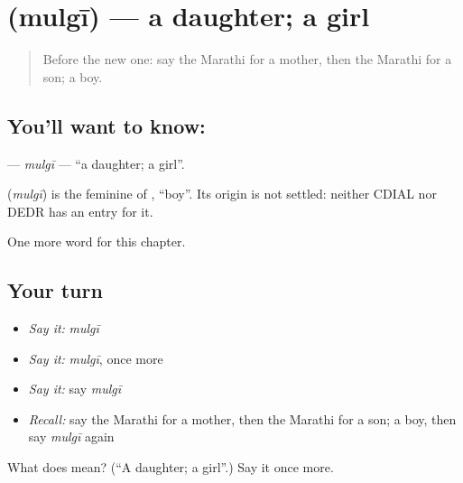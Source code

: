 \section[\texorpdfstring{\mr{मुलगी} (mulgī)}{मुलगी (mulgī)}]{ (mulgī) — a daughter; a girl}

\label{lesson:MR-C74-mulgi}



\begin{quote}
Before the new one: say the Marathi for a mother, then the Marathi for a son; a boy.
\end{quote}

\subsection*{You'll want to know: }
\textbf{} — \emph{mulgī} — \textquotedblleft{}a daughter; a girl\textquotedblright{}.

\begin{cousinweb}
\textbf{} (\emph{mulgī}) is the feminine of \textbf{}, \textquotedblleft{}boy\textquotedblright{}. Its origin is not settled: neither CDIAL nor DEDR has an entry for it.
\end{cousinweb}

\begin{grammarlens}[title={What you've built}]
One more word for this chapter.
\end{grammarlens}

\subsection*{Your turn}
\begin{itemize}
\raggedright
  \item \emph{Say it:} \emph{mulgī}
  \item \emph{Say it:} \emph{mulgī}, once more
  \item \emph{Say it:} say \emph{mulgī}
  \item \emph{Recall:} say the Marathi for a mother, then the Marathi for a son; a boy, then say \emph{mulgī} again
\end{itemize}

\begin{tcolorbox}[breakable,colback=teal!4,colframe=teal!35!black,title={Before you move on}]
What does  mean? (\textquotedblleft{}A daughter; a girl\textquotedblright{}.) Say it once more.
\end{tcolorbox}

